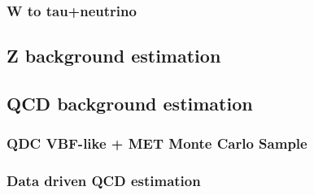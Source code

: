 
\subsubsection{W to tau+neutrino}


\subsection{Z background estimation}


\subsection{QCD background estimation}


\subsubsection{QDC VBF-like + MET Monte Carlo Sample}


\subsubsection{Data driven QCD estimation}


